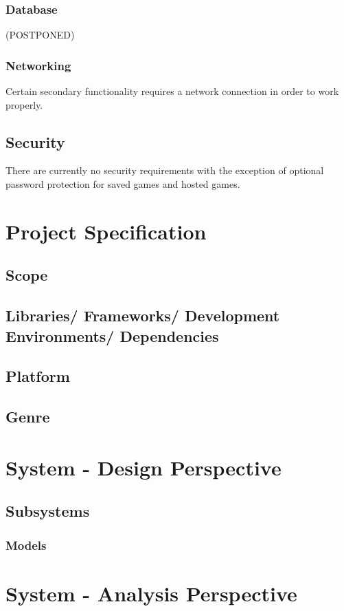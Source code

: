 \documentclass{article}
\begin{document}
\subsubsection{Database}
(POSTPONED)
\subsubsection{Networking}
Certain secondary functionality requires a network connection in order to work properly.

\subsection{Security}
There are currently no security requirements with the exception of optional password protection for saved games and hosted games.
\section{Project Specification}
\subsection{Scope}
\subsection{Libraries/ Frameworks/ Development Environments/ Dependencies}
\subsection{Platform}
\subsection{Genre}
\section{System - Design Perspective}
\subsection{Subsystems}
\subsubsection{Models}

\section{System - Analysis Perspective}
\end{document}
